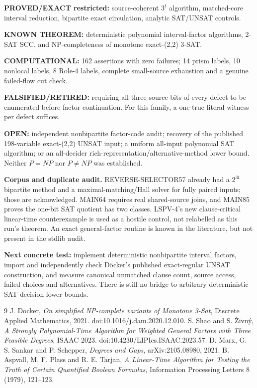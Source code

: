 \documentclass[10pt]{article}
\begin{document}
\noindent\textbf{PROVED/EXACT restricted:} source-coherent $3^t$ algorithm, matched-core interval reduction, bipartite exact circulation, analytic SAT/UNSAT controls.

\noindent\textbf{KNOWN THEOREM:} deterministic polynomial interval-factor algorithms, 2-SAT SCC, and NP-completeness of monotone exact-(2,2) 3-SAT.

\noindent\textbf{COMPUTATIONAL:} 162 assertions with zero failures; 14 prism labels, 10 nonlocal labels, 8 Role-4 labels, complete small-source exhaustion and a genuine failed-flow cut check.

\noindent\textbf{FALSIFIED/RETIRED:} requiring all three source bits of every defect to be enumerated before factor continuation. For this family, a one-true-literal witness per defect suffices.

\noindent\textbf{OPEN:} independent nonbipartite factor-code audit; recovery of the published 198-variable exact-(2,2) UNSAT input; a uniform all-input polynomial SAT algorithm; or an all-decider rich-representation/alternative-method lower bound. Neither $P=NP$ nor $P\ne NP$ was established.

\noindent\textbf{Corpus and duplicate audit.} REVERSE-SELECTOR57 already had a $2^{3t}$ bipartite method and a maximal-matching/Hall solver for fully paired inputs; those are acknowledged. MAIN64 requires real shared-source joins, and MAIN85 proves the one-bit SAT quotient has two classes. LSPV-4's new clause-critical linear-time counterexample is used as a hostile control, not relabelled as this run's theorem. An exact general-factor routine is known in the literature, but not present in the stdlib audit.

\noindent\textbf{Next concrete test:} implement deterministic nonbipartite interval factors, import and independently check D\"ocker's published exact-regular UNSAT construction, and measure canonical unmatched clause count, source access, failed choices and alternatives. There is still no bridge to arbitrary deterministic SAT-decision lower bounds.

\begin{thebibliography}{9}
 J. D\"ocker, \emph{On simplified NP-complete variants of Monotone 3-Sat}, Discrete Applied Mathematics, 2021. doi:10.1016/j.dam.2020.12.010.
 S. Shao and S. \v{Z}ivn\'y, \emph{A Strongly Polynomial-Time Algorithm for Weighted General Factors with Three Feasible Degrees}, ISAAC 2023. doi:10.4230/LIPIcs.ISAAC.2023.57.
 D. Marx, G. S. Sankar and P. Schepper, \emph{Degrees and Gaps}, arXiv:2105.08980, 2021.
 B. Aspvall, M. F. Plass and R. E. Tarjan, \emph{A Linear-Time Algorithm for Testing the Truth of Certain Quantified Boolean Formulas}, Information Processing Letters 8 (1979), 121--123.
\end{thebibliography}
\end{document}
